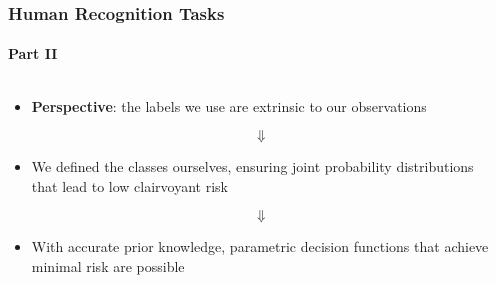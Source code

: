 \documentclass[aspectratio=169,usenames,dvipsnames]{beamer}
\begin{document}
\begin{frame}
\begin{columns}[c]
\begin{column}{.5\linewidth}
\end{column}

\end{columns}

\end{frame}






\begin{frame}
\frametitle{Human Recognition Tasks}
\framesubtitle{Part II}


\begin{columns}[c]

\begin{column}{.5\linewidth}

\begin{itemize}
\item \textbf{Perspective}: the labels we use are \alert{extrinsic} to our observations

\vspace{-1em}
\Large
\begin{equation*} 
\Downarrow
\end{equation*}
\normalsize

\item We defined the classes ourselves, ensuring joint probability distributions that lead to \alert{low clairvoyant risk}

\vspace{-1em}
\Large
\begin{equation*} 
\Downarrow
\end{equation*}
\normalsize

\item With accurate prior knowledge, parametric decision functions that \alert{achieve minimal risk} are possible
\end{itemize}

\end{column}




\begin{column}{.5\linewidth}


\end{column}
\end{columns}
\end{frame}
\end{document}
